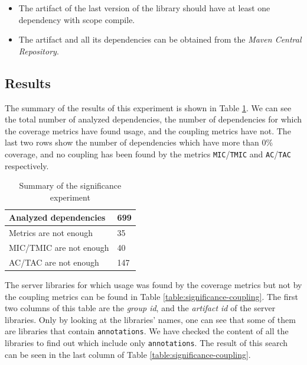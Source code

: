 \begin{itemize}
  \item The artifact of the last version of the library should have at least one dependency with scope compile.
  \item The artifact and all its dependencies can be obtained from the \textit{Maven Central Repository}.
\end{itemize}

\subsection{Results}

The summary of the results of this experiment is shown in Table \ref{table:summary-significance}. We can see the total number of analyzed dependencies, the number of dependencies for which the coverage metrics have found usage, and the coupling metrics have not. The last two rows show the number of dependencies which have more than 0\% coverage, and no coupling has been found by the metrics \texttt{MIC}/\texttt{TMIC} and \texttt{AC}/\texttt{TAC} respectively.

\begin{table}[ht!]
\begin{center}
\begin{tabular}{l|l}
  \hline
  Analyzed dependencies   & 699 \\\hline
  Metrics are not enough  & 35  \\\hline
  MIC/TMIC are not enough & 40  \\\hline
  AC/TAC are not enough   & 147 \\\hline
\end{tabular}
\end{center}
\caption{Summary of the significance experiment}
\label{table:summary-significance}
\end{table}

The server libraries for which usage was found by the coverage metrics but not by the coupling metrics can be found in Table \ref{table:significance-coupling}. The first two columns of this table are the \textit{group id}, and the \textit{artifact id} of the server libraries. Only by looking at the libraries' names, one can see that some of them are libraries that contain \texttt{annotations}. We have checked the content of all the libraries to find out which include only \texttt{annotations}. The result of this search can be seen in the last column of Table \ref{table:significance-coupling}.

